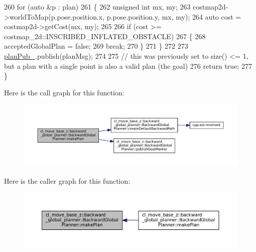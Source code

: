 \begin{DoxyCode}
260     \textcolor{keywordflow}{for} (\textcolor{keyword}{auto} &p : plan)
261     \{
262         \textcolor{keywordtype}{unsigned} \textcolor{keywordtype}{int} mx, my;
263         costmap2d->worldToMap(p.pose.position.x, p.pose.position.y, mx, my);
264         \textcolor{keyword}{auto} cost = costmap2d->getCost(mx, my);
265 
266         \textcolor{keywordflow}{if} (cost >= costmap\_2d::INSCRIBED\_INFLATED\_OBSTACLE)
267         \{
268             acceptedGlobalPlan = \textcolor{keyword}{false};
269             \textcolor{keywordflow}{break};
270         \}
271     \}
272     
273     \hyperlink{classcl__move__base__z_1_1backward__global__planner_1_1BackwardGlobalPlanner_a561eab039140948c52ec928c191f3f43}{planPub\_}.publish(planMsg);
274 
275     \textcolor{comment}{// this was previously set to size() <= 1, but a plan with a single point is also a valid plan (the
       goal)}
276     \textcolor{keywordflow}{return} \textcolor{keyword}{true};
277 \}
\end{DoxyCode}
Here is the call graph for this function\+:
\nopagebreak
\begin{figure}[H]
\begin{center}
\leavevmode
\includegraphics[width=350pt]{classcl__move__base__z_1_1backward__global__planner_1_1BackwardGlobalPlanner_a3f1f3c81e7c52c9305544fd793741a41_cgraph}
\end{center}
\end{figure}
Here is the caller graph for this function\+:
\nopagebreak
\begin{figure}[H]
\begin{center}
\leavevmode
\includegraphics[width=350pt]{classcl__move__base__z_1_1backward__global__planner_1_1BackwardGlobalPlanner_a3f1f3c81e7c52c9305544fd793741a41_icgraph}
\end{center}
\end{figure}
\mbox{\label{classcl__move__base__z_1_1backward__global__planner_1_1BackwardGlobalPlanner_a2fe289017031d072f4ac32d017fe989d}} 
